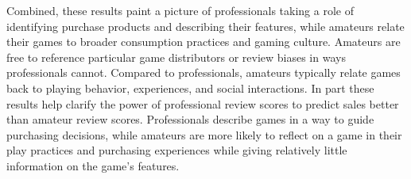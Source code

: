 \documentclass{sig-alternate}
\begin{document}

Combined, these results paint a picture of professionals taking a role of identifying purchase products and describing their features, while amateurs relate their games to broader consumption practices and gaming culture. Amateurs are free to reference particular game distributors or review biases in ways professionals cannot. Compared to professionals, amateurs typically relate games back to playing behavior, experiences, and social interactions. In part these results help clarify the power of professional review scores to predict sales better than amateur review scores. Professionals describe games in a way to guide purchasing decisions, while amateurs are more likely to reflect on a game in their play practices and purchasing experiences while giving relatively little information on the game's features.
\end{document}
